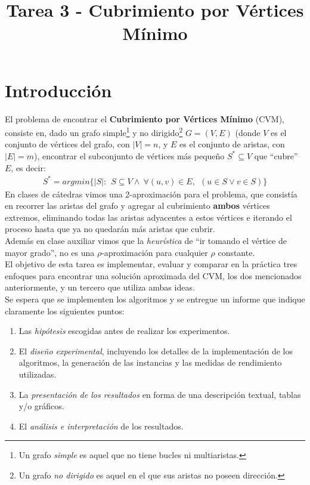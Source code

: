 \documentclass[dcc,uchile]{fcfmcourse}
\title{Tarea 3 - Cubrimiento por Vértices Mínimo}
\begin{document}
\captionsetup[table]{name=Tabla}
\captionsetup[table]{name=Figura}

\maketitle
\vspace{-1ex}
\section{Introducción}
El problema de encontrar el \textbf{Cubrimiento por Vértices Mínimo} (CVM), consiste en, dado un grafo simple\footnote{Un grafo \textit{simple} es aquel que no tiene bucles ni multiaristas.} y no dirigido\footnote{Un grafo \textit{no dirigido} es aquel en el que sus aristas no poseen dirección.} $G = (V,E)$ (donde $V$ es el conjunto de vértices del grafo, con $|V| = n$, y $E$ es el conjunto de aristas, con $|E| = m$), encontrar el subconjunto de vértices más pequeño $S^*\subseteq V$ que ``cubre'' $E$, es decir:
\begin{align*}
    S^* = argmin \{|S| \colon\ \ S\subseteq V \land \ \forall (u, v) \in E,\ \ (u \in S \lor v \in S)\}
\end{align*}
En clases de cátedras vimos una 2-aproximación para el problema, que consistía en recorrer las aristas del grafo y agregar al cubrimiento \textbf{ambos} vértices extremos, eliminando todas las aristas adyacentes a estos vértices e iterando el proceso hasta que ya no quedarán más aristas que cubrir.\\
Además en clase  auxiliar vimos que la \textit{heurística} de ``ir tomando el vértice de mayor grado'', no es una $\rho$-aproximación para cualquier $\rho$ constante.\\

El objetivo de esta tarea es implementar, evaluar y comparar en la práctica tres enfoques para encontrar una solución aproximada del CVM, los dos mencionados anteriormente, y un tercero que utiliza ambas ideas.\\


Se espera que se implementen los algoritmos y se entregue un informe que indique claramente los siguientes puntos:
\begin{enumerate}[1.]
    \item Las \textit{hipótesis} escogidas antes de realizar los experimentos.
    \item El \textit{diseño experimental}, incluyendo los detalles de la implementación de los algoritmos, la generación de las instancias y las medidas de rendimiento utilizadas.
    \item La \textit{presentación de los resultados} en forma de una descripción textual, tablas y/o gráficos.
    \item El \textit{análisis e interpretación} de los resultados.
\end{enumerate}
\end{document}
